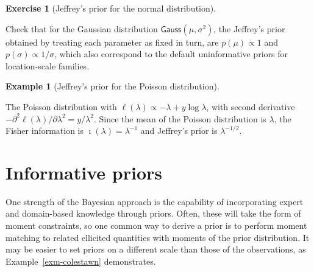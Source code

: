 \documentclass[
  11pt,
  letterpaper,
]{scrbook}
\theoremstyle{definition}
\newtheorem{exercise}{Exercise}[chapter]
\theoremstyle{plain}
\theoremstyle{plain}
\theoremstyle{definition}
\newtheorem{example}{Example}[chapter]
\theoremstyle{definition}
\theoremstyle{remark}
\begin{document}
\begin{exercise}[Jeffrey's prior for the normal
distribution]\protect\hypertarget{exr-jeffreysnormal}{}\label{exr-jeffreysnormal}

Check that for the Gaussian distribution
\(\mathsf{Gauss}(\mu, \sigma^2)\), the Jeffrey's prior obtained by
treating each parameter as fixed in turn, are \(p(\mu) \propto 1\) and
\(p(\sigma) \propto 1/\sigma\), which also correspond to the default
uninformative priors for location-scale families.

\end{exercise}

\begin{example}[Jeffrey's prior for the Poisson
distribution]\protect\hypertarget{exm-jeffreyspoisson}{}\label{exm-jeffreyspoisson}

The Poisson distribution with
\(\ell(\lambda) \propto -\lambda + y\log \lambda\), with second
derivative
\(-\partial^2 \ell(\lambda)/\partial \lambda^2 = y/\lambda^2\). Since
the mean of the Poisson distribution is \(\lambda\), the Fisher
information is \(\imath(\lambda) = \lambda^{-1}\) and Jeffrey's prior is
\(\lambda^{-1/2}\).

\end{example}

\section{Informative priors}\label{informative-priors}

One strength of the Bayesian approach is the capability of incorporating
expert and domain-based knowledge through priors. Often, these will take
the form of moment constraints, so one common way to derive a prior is
to perform moment matching to related ellicited quantities with moments
of the prior distribution. It may be easier to set priors on a different
scale than those of the observations, as Example~\ref{exm-colestawn}
demonstrates.
\end{document}
